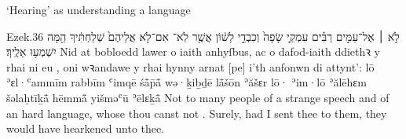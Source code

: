 \begin{frame}{\ex ‘Hearing’ as understanding a language}
	\begin{example}{Ezek.}{3}{6}{}{}
		\quoling
		{לֹ֣א ׀ אֶל־עַמִּ֣ים רַבִּ֗ים עִמְקֵ֤י שָׂפָה֙ וְכִבְדֵ֣י לָשׁ֔וֹן אֲשֶׁ֥ר לֹֽא־  אִם־לֹ֤א אֲלֵיהֶם֙ שְׁלַחְתִּ֔יךָ הֵ֖מָּה יִשְׁמְע֥וּ אֵלֶֽיךָ׃}
		{Nid at bobloedd lawer o iaith anhyſbus, ac o dafod-iaith ddiethꝛ y rhai ni  eu , oni wꝛandawe y rhai hynny arnat [pe] i’th anfonwn di attynt’:}
		{lō ʾɛl·ʿammīm rabbīm ʿimqē śå̄p̄å̄ wə·ḵiḇḏē lå̄šōn ʾăšɛr lō·  ʾim·lō ʾălēhɛm šəlaḥtīḵå̄ hēmmå̄ yišməʿū ʾēlɛḵå̄}
		{Not to many people of a strange speech and of an hard language, whose  thou canst not . Surely, had I sent thee to them, they would have hearkened unto thee.}
	\end{example}
\end{frame}









